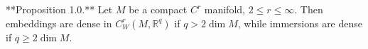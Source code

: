 **Proposition 1.0.** Let $M$ be a compact $C^r$ manifold, $2 \leq r \leq \infty$. Then embeddings are dense in $C^r_W(M, \mathbb{R}^q)$ if $q > 2 \dim M$, while immersions are dense if $q \geq 2 \dim M$.

